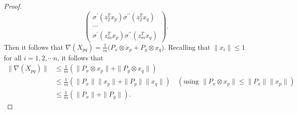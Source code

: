 \documentclass[a4paper,11pt]{amsart}
\theoremstyle{definition}
\theoremstyle{plain}
\theoremstyle{remark}
\newcommand{\ot}{\otimes}
\begin{document}
\begin{proof}
\[\begin{pmatrix}
                                                                                                                                                                                                                                                                              \sigma^{\prime}(z_2^Tx_p)\sigma^{\prime\prime}(z_2^Tx_q)\\
                                                                                                                                                                                                                                                                              \cdots\\
                                                                                                                                                                                                                                                                              \sigma^{\prime}(z_m^Tx_p)\sigma^{\prime\prime}(z_m^Tx_q)
                                                                                                                                                                                                                                                                             \end{pmatrix}.\] Then it follows that $\nabla(X_{pq})=\frac{1}{m}\big(P_x\otimes x_p+P_y\otimes x_q\Big)$. Recalling that $\|x_i\|\leq1$ for all $i=1,2,\cdots n$, it follows that 
\begin{equation}
\begin{split}
\|\nabla(X_{pq})\|&\leq\frac{1}{m}(\|P_x\ot x_p\|+\|P_y\ot x_q\|)\\
&\leq\frac{1}{m}(\|P_x\|\| x_p\|+\|P_y\|\| x_q\|)\quad(\text{using $\|P_x\ot x_p\|\leq\|P_x\|\|x_p\|$})\\
&\leq\frac{1}{m}(\|P_x\|+\|P_y\|).
\end{split}

\end{equation}
\end{proof}
\end{document}
